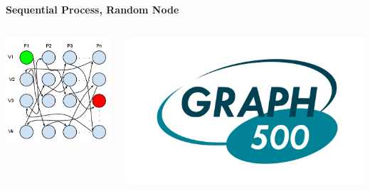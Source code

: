\documentclass[final]{beamer} %
\begin{document}
\begin{frame}[t]
\begin{columns}[t]
\begin{column}{0.60\paperwidth}
\begin{columns}[t,totalwidth=0.60\paperwidth]
\begin{column}{0.28\paperwidth}
						\begin{center} \bf{Sequential Process, Random Node} \end{center}
						\begin{columns}[t,totalwidth=0.28\paperwidth]
							\begin{column}{0.12\paperwidth}
								\begin{center} \includegraphics[width=0.12\paperwidth]{img/linked_list/seq_proc_rand_node} \end{center}
							\end{column}
							\begin{column}{0.12\paperwidth}
								\begin{center} \includegraphics[width=0.12\paperwidth]{img/logo_graph500} \end{center}

\end{column}
\end{columns}
\end{column}
\end{columns}
\end{column}
\end{columns}
\end{frame}
\end{document}
